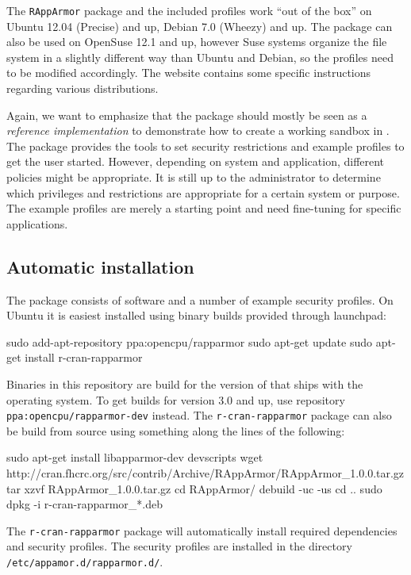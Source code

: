 The \texttt{RAppArmor} package and the included profiles work ``out of the box''
on Ubuntu 12.04 (Precise) and up, Debian 7.0 (Wheezy) and up. The package can
also be used on OpenSuse 12.1 and up, however Suse systems organize the file
system in a slightly different way than Ubuntu and Debian, so the profiles need
to be modified accordingly. The \RAppArmor website contains some specific
instructions regarding various distributions.


Again, we want to emphasize that the package should mostly be seen as a
\emph{reference implementation} to demonstrate how to create a working sandbox
in \R. The \RAppArmor package provides the tools to set security restrictions
and example profiles to get the user started. However, depending on system and
application, different policies might be appropriate. It is still up to the
administrator to determine which privileges and restrictions are appropriate
for a certain system or purpose. The example profiles are merely a starting
point and need fine-tuning for specific applications.

\subsection{Automatic installation}

The \RAppArmor package consists of \R software and a number of example security
profiles. On Ubuntu it is easiest installed using binary builds provided
through launchpad:

\begin{codeblock}
sudo add-apt-repository ppa:opencpu/rapparmor
sudo apt-get update
sudo apt-get install r-cran-rapparmor
\end{codeblock}

Binaries in this repository are build for the version of \R that ships with the
operating system. To get builds for \R version 3.0 and up, use repository
\texttt{ppa:opencpu/rapparmor-dev} instead. The \texttt{r-cran-rapparmor}
package can also be build from source using something along the lines of the
following:

\begin{codeblock}
sudo apt-get install libapparmor-dev devscripts
wget http://cran.fhcrc.org/src/contrib/Archive/RAppArmor/RAppArmor_1.0.0.tar.gz
tar xzvf RAppArmor_1.0.0.tar.gz
cd RAppArmor/
debuild -uc -us
cd ..
sudo dpkg -i r-cran-rapparmor_*.deb
\end{codeblock}

The \texttt{r-cran-rapparmor} package will automatically install required
dependencies and security profiles. The security profiles are installed in
the directory \texttt{/etc/appamor.d/rapparmor.d/}.

